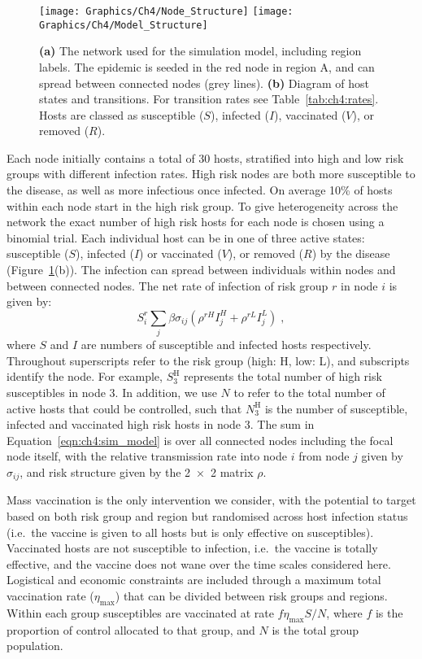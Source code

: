 \begin{figure}[htb]
    \centering
    \texttt{[image: Graphics/Ch4/Node\_Structure]}
    \texttt{[image: Graphics/Ch4/Model\_Structure]}
    \caption[Network epidemic model structure]{\textbf{(a)} The network used for the simulation model, including region labels. The epidemic is seeded in the red node in region A, and can spread between connected nodes (grey lines). \textbf{(b)} Diagram of host states and transitions. For transition rates see Table~\ref{tab:ch4:rates}. Hosts are classed as susceptible ($S$), infected ($I$), vaccinated ($V$), or removed ($R$).}
    \label{fig:ch4:node_structure_and_model}
\end{figure}

Each node initially contains a total of 30 hosts, stratified into high and low risk groups with different infection rates. High risk nodes are both more susceptible to the disease, as well as more infectious once infected. On average 10\% of hosts within each node start in the high risk group. To give heterogeneity across the network the exact number of high risk hosts for each node is chosen using a binomial trial. Each individual host can be in one of three active states: susceptible ($S$), infected ($I$) or vaccinated ($V$), or removed ($R$) by the disease (Figure~\ref{fig:ch4:node_structure_and_model}(b)). The infection can spread between individuals within nodes and between connected nodes. The net rate of infection of risk group $r$ in node $i$ is given by:
\begin{equation}\label{eqn:ch4:sim_model}
    S_i^r \sum_j\beta\sigma_{ij} \left(\rho^{rH}I_j^H + \rho^{rL}I_j^L\right)\;,
\end{equation}
where $S$ and $I$ are numbers of susceptible and infected hosts respectively. Throughout superscripts refer to the risk group (high: H, low: L), and subscripts identify the node. For example, $S_{3}^\mathrm{H}$ represents the total number of high risk susceptibles in node 3. In addition, we use $N$ to refer to the total number of active hosts that could be controlled, such that $N_{3}^\mathrm{H}$ is the number of susceptible, infected and vaccinated high risk hosts in node 3. The sum in Equation~\ref{eqn:ch4:sim_model} is over all connected nodes including the focal node itself, with the relative transmission rate into node $i$ from node $j$ given by $\sigma_{ij}$, and risk structure given by the \num{2x2} matrix $\rho$.

Mass vaccination is the only intervention we consider, with the potential to target based on both risk group and region but randomised across host infection status (i.e.\ the vaccine is given to all hosts but is only effective on susceptibles). Vaccinated hosts are not susceptible to infection, i.e.\ the vaccine is totally effective, and the vaccine does not wane over the time scales considered here. Logistical and economic constraints are included through a maximum total vaccination rate ($\eta_{\mathrm{max}}$) that can be divided between risk groups and regions. Within each group susceptibles are vaccinated at rate $f\eta_{\mathrm{max}}S/N$, where $f$ is the proportion of control allocated to that group, and $N$ is the total group population.

